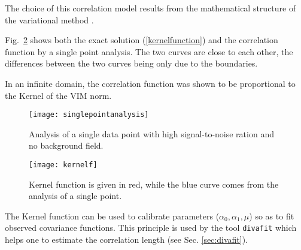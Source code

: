 %
%
%
%
%
%
%

The choice of this correlation model results from the mathematical structure of the variational method \citep{BRASSEUR96}.

Fig.~\ref{kernel1} shows both the exact solution (\ref{kernelfunction}) and the correlation function by a single point analysis. The two curves are close to each other, the differences between the two curves being only due to the boundaries.

In an infinite domain, the correlation function was shown to be proportional to the Kernel of the VIM norm.

\begin{figure}[H]
\centering
\texttt{[image: singlepointanalysis]}
\caption{Analysis of a single data point with high signal-to-noise ration and no background field.\label{singleanalysis}}
\end{figure}

\begin{figure}[H]
\centering
\texttt{[image: kernelf]}
\caption{Kernel function is given in red, while the blue curve comes from the analysis of a single point.\label{kernel1}}
\end{figure}


The Kernel function can be used to calibrate \diva parameters ($\alpha_0, \alpha_1, \mu$) so as to fit observed covariance functions. This principle is used by the tool \texttt{divafit} which helps one to estimate the correlation length (see Sec. \ref{sec:divafit}).

